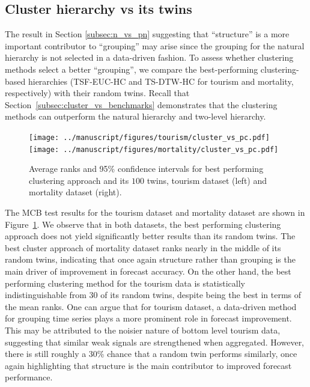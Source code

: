 \documentclass[a4paper,review,12pt,authoryear]{elsarticle}
\begin{document}
\subsection{Cluster hierarchy vs its twins}
\label{subsec:P3_c_vs_pc}

The result in Section \ref{subsec:n_vs_pn} suggesting that ``structure'' is a more important contributor to ``grouping'' may arise since the grouping for the natural hierarchy is not selected in a data-driven fashion. %
To assess whether clustering methods select a better ``grouping'', we compare the best-performing clustering-based hierarchies (TSF-EUC-HC and TS-DTW-HC for tourism and mortality, respectively) with their random twins.  Recall that Section~\ref{subsec:cluster_vs_benchmarks} demonstrates that the clustering methods can outperform the natural hierarchy and two-level hierarchy. 

\begin{figure}[h!]
    \centering
    \texttt{[image: ../manuscript/figures/tourism/cluster\_vs\_pc.pdf]}
    \texttt{[image: ../manuscript/figures/mortality/cluster\_vs\_pc.pdf]}
    \caption{\label{fig:P3_tourism_c_vs_pc}Average ranks and 95\% confidence intervals for best performing clustering approach and its $100$ twins, tourism dataset (left) and mortality dataset (right).}
\end{figure}


The MCB test results for the tourism dataset and mortality dataset are shown in Figure~\ref{fig:P3_tourism_c_vs_pc}.
We observe that in both datasets, the best performing clustering approach does not yield significantly better results than its random twins. 
The best cluster approach of mortality dataset ranks nearly in the middle of its random twins, indicating that once again structure rather than grouping is the main driver of improvement in forecast accuracy. 
On the other hand, the best performing clustering method for the tourism data is statistically indistinguishable from 30 of its random twins, despite being the best in terms of the mean ranks. One can argue that for tourism dataset, a data-driven method for grouping time series plays a more prominent role in forecast improvement. %
This may be attributed to the noisier nature of bottom level tourism data, suggesting that similar weak signals are strengthened when aggregated.
However, there is still roughly a 30\% chance that a random twin performs similarly, once again highlighting that structure is the main contributor to improved forecast performance.
\end{document}
